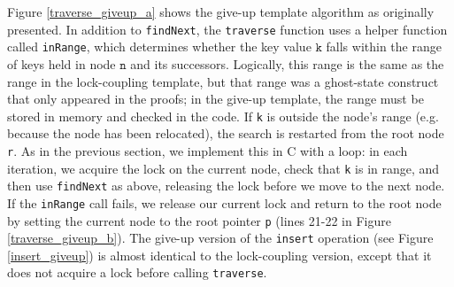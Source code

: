 \documentclass[a4paper,UKenglish,cleveref, autoref, thm-restate]{lipics-v2021}
\begin{document}
Figure \ref{traverse_giveup_a} shows the give-up template algorithm as originally presented. In addition to \lstinline{findNext}, the \lstinline{traverse} function uses a helper function called \lstinline{inRange}, which determines whether the key value $\texttt{k}$ falls within the range of keys held in node $\texttt{n}$ and its successors. Logically, this range is the same as the range in the lock-coupling template, but that range was a ghost-state construct that only appeared in the proofs; in the give-up template, the range must be stored in memory and checked in the code. If \lstinline{k} is outside the node's range (e.g. because the node has been relocated), the search is restarted from the root node \lstinline{r}. As in the previous section, we implement this in C with a loop: in each iteration, we acquire the lock on the current node, check that \lstinline{k} is in range, and then use \lstinline{findNext} as above, releasing the lock before we move to the next node. If the \lstinline{inRange} call fails, we release our current lock and return to the root node by setting the current node to the root pointer \lstinline{p} (lines 21-22 in Figure \ref{traverse_giveup_b}). The give-up version of the \texttt{insert} operation (see Figure \ref{insert_giveup}) is almost identical to the lock-coupling version, except that it does not acquire a lock before calling \texttt{traverse}.
\end{document}
